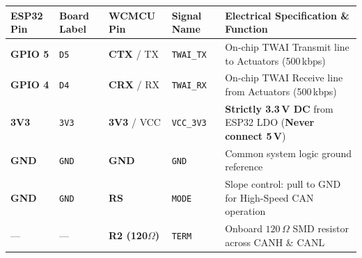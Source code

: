 \documentclass[10pt,a4paper]{article}
\begin{document}
\begin{tcolorbox}[bwcard, title={2. Classic ESP32 (esp32dev) to WCMCU-230 Module (Low CAN)}]
\begin{tabularx}{\textwidth}{@{} C{1.8cm} C{1.5cm} C{1.8cm} C{1.8cm} Y @{}}
\toprule
\textbf{ESP32 Pin} & \textbf{Board Label} & \textbf{WCMCU Pin} & \textbf{Signal Name} & \textbf{Electrical Specification \& Function} \\
\midrule
\textbf{GPIO 5} & \texttt{D5} & \textbf{CTX} / TX & \texttt{TWAI\_TX} & On-chip TWAI Transmit line to Actuators (500\,kbps) \\
\textbf{GPIO 4} & \texttt{D4} & \textbf{CRX} / RX & \texttt{TWAI\_RX} & On-chip TWAI Receive line from Actuators (500\,kbps) \\
\textbf{3V3} & \texttt{3V3} & \textbf{3V3} / VCC & \texttt{VCC\_3V3} & \textbf{Strictly 3.3\,V DC} from ESP32 LDO (\textbf{Never connect 5\,V}) \\
\textbf{GND} & \texttt{GND} & \textbf{GND} & \texttt{GND} & Common system logic ground reference \\
\textbf{GND} & \texttt{GND} & \textbf{RS} & \texttt{MODE} & Slope control: pull to GND for High-Speed CAN operation \\
— & — & \textbf{R2 (120$\Omega$)} & \texttt{TERM} & Onboard $120\,\Omega$ SMD resistor across CANH \& CANL \\
\bottomrule
\end{tabularx}
\end{tcolorbox}

\vspace{-8pt}
\end{document}
